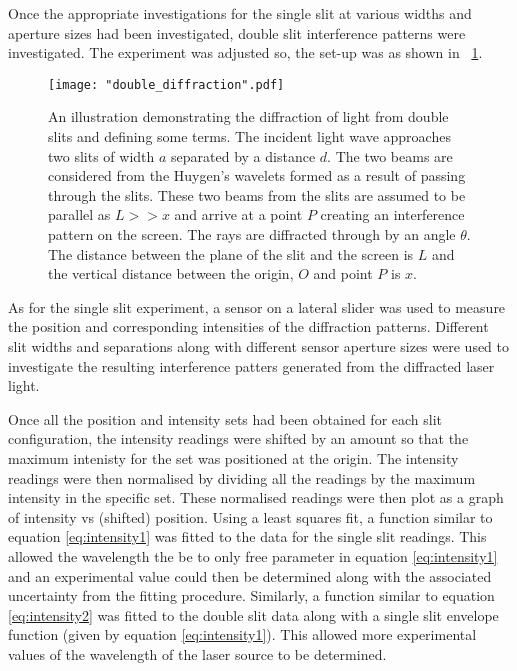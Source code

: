 \documentclass{article}
\newcommand{\figref}[2][\figurename~]{#1\ref{#2}}
\begin{document}
\vspace{2mm}
\noindent
Once the appropriate investigations for the single slit at various widths and aperture sizes had been investigated, double slit interference patterns were investigated. The experiment was adjusted so, the set-up was as shown in \figref{fig:double_diffraction}.

\begin{figure}[h]
\centering
\texttt{[image: "double\_diffraction".pdf]}
\caption{An illustration demonstrating the diffraction of light from double slits and defining some terms. The incident light wave approaches two slits of width $a$ separated by a distance $d$. The two beams are considered from the Huygen's wavelets \cite{Book01} formed as a result of passing through the slits. These two beams from the slits are assumed to be parallel as $L >> x$ and arrive at a point $P$ creating an interference pattern on the screen. The rays are diffracted through by an angle $\theta$. The distance between the plane of the slit and the screen is $L$ and the vertical distance between the origin, $O$ and point $P$ is $x$.}
\label{fig:double_diffraction}
\end{figure}

\vspace{2mm}
\noindent
As for the single slit experiment, a sensor on a lateral slider was used to measure the position and corresponding intensities of the diffraction patterns. Different slit widths and separations along with different sensor aperture sizes were used to investigate the resulting interference patters generated from the diffracted laser light.

\vspace{2mm}
\noindent
Once all the position and intensity sets had been obtained for each slit configuration, the intensity readings were shifted by an amount so that the maximum intenisty for the set was positioned at the origin. The intensity readings were then normalised by dividing all the readings by the maximum intensity in the specific set. These normalised readings were then plot as a graph of intensity vs (shifted) position. Using a least squares fit, a function similar to equation \eqref{eq:intensity1} was fitted to the data for the single slit readings. This allowed the wavelength the be to only free parameter in equation \eqref{eq:intensity1} and an experimental value could then be determined along with the associated uncertainty from the fitting procedure. Similarly, a function similar to equation \eqref{eq:intensity2} was fitted to the double slit data along with a single slit envelope function (given by equation \eqref{eq:intensity1}). This allowed more experimental values of the wavelength of the laser source to be determined.
\end{document}
